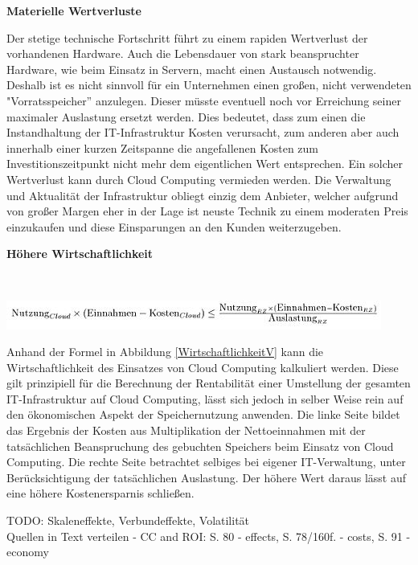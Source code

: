 \documentclass[12pt,a4paper,bibliography=totocnumbered,listof=totocnumbered]{scrartcl}
\begin{document}
\textbf{Materielle Wertverluste}

Der stetige technische Fortschritt führt zu einem rapiden Wertverlust der vorhandenen Hardware. Auch die Lebensdauer von stark beanspruchter Hardware, wie beim Einsatz in Servern, macht einen Austausch notwendig. Deshalb ist es nicht sinnvoll für ein Unternehmen einen großen, nicht verwendeten "Vorratsspeicher'' anzulegen. Dieser müsste eventuell noch vor Erreichung seiner maximaler Auslastung ersetzt werden. Dies bedeutet, dass zum einen die Instandhaltung der IT-Infrastruktur Kosten verursacht, zum anderen aber auch innerhalb einer kurzen Zeitspanne die angefallenen Kosten zum Investitionszeitpunkt nicht mehr dem eigentlichen Wert entsprechen. Ein solcher Wertverlust kann durch Cloud Computing vermieden werden. Die Verwaltung und Aktualität der Infrastruktur obliegt einzig dem Anbieter, welcher aufgrund von großer Margen eher in der Lage ist neuste Technik zu einem moderaten Preis einzukaufen und diese Einsparungen an den Kunden weiterzugeben.

\textbf{Höhere Wirtschaftlichkeit}

\vspace{1em}
$\;$\\
\begin{minipage}{\linewidth}
	\centering
	\includegraphics[width=1.0\linewidth]{Wirtschaftlichkeit.jpg}
 	\label{WirtschaftlichkeitV}
\end{minipage}
\vspace{1em}

Anhand der Formel in Abbildung \ref{WirtschaftlichkeitV} kann die Wirtschaftlichkeit des Einsatzes von Cloud Computing kalkuliert werden. Diese gilt prinzipiell für die Berechnung der Rentabilität einer Umstellung der gesamten IT-Infrastruktur auf Cloud Computing, lässt sich jedoch in selber Weise rein auf den ökonomischen Aspekt der Speichernutzung anwenden. Die linke Seite bildet das Ergebnis der Kosten aus Multiplikation der Nettoeinnahmen mit der tatsächlichen Beanspruchung des gebuchten Speichers beim Einsatz von Cloud Computing. Die rechte Seite betrachtet selbiges bei eigener IT-Verwaltung, unter Berücksichtigung der tatsächlichen Auslastung. Der höhere Wert daraus lässt auf eine höhere Kostenersparnis schließen.

TODO: Skaleneffekte, Verbundeffekte, Volatilität\\
Quellen in Text verteilen - CC and ROI: S. 80 - effects, S. 78/160f. -  costs, S. 91 - economy
\end{document}
